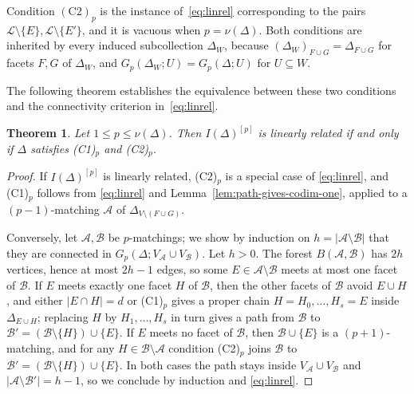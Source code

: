 \documentclass{amsart}
\newtheorem{Theorem}{Theorem}[section]
\theoremstyle{definition}
\theoremstyle{remark}
\begin{document}
Condition $(\mathrm C2)_p$ is the instance of~\eqref{eq:linrel}
corresponding to the pairs
$\mathcal L\setminus\{E\},\mathcal L\setminus\{E'\}$, and it is
vacuous when $p=\nu(\Delta)$.
Both conditions are inherited by every induced subcollection
$\Delta_W$, because $(\Delta_W)_{F\cup G}=\Delta_{F\cup G}$ for facets
$F,G$ of $\Delta_W$, and
$G_p(\Delta_W;U)=G_p(\Delta;U)$ for $U\subseteq W$.

The following theorem establishes the equivalence between these two
conditions and the connectivity criterion in~\eqref{eq:linrel}.


\begin{Theorem}\label{thm:lin-rel-char}
Let $1\leq p\leq\nu(\Delta)$. Then $I(\Delta)^{[p]}$ is linearly related if and only if $\Delta$ satisfies \textnormal{(C1)$_p$} and \textnormal{(C2)$_p$}.
\end{Theorem}
\begin{proof}
If $I(\Delta)^{[p]}$ is linearly related, (C2)$_p$ is a special case of \eqref{eq:linrel}, and (C1)$_p$ follows from \eqref{eq:linrel} and Lemma~\ref{lem:path-gives-codim-one}, applied to a $(p-1)$-matching $\mathcal A$ of $\Delta_{V\setminus(F\cup G)}$.

Conversely, let $\mathcal A,\mathcal B$ be $p$-matchings; we show by induction on $h=|\mathcal A\setminus\mathcal B|$ that they are connected in $G_p(\Delta;V_{\mathcal A}\cup V_{\mathcal B})$. Let $h>0$. The forest $B(\mathcal A,\mathcal B)$ has $2h$ vertices, hence at most $2h-1$ edges, so some $E\in\mathcal A\setminus\mathcal B$ meets at most one facet of $\mathcal B$. If $E$ meets exactly one facet $H$ of $\mathcal B$, then the other facets of $\mathcal B$ avoid $E\cup H$, and either $|E\cap H|=d$ or (C1)$_p$ gives a proper chain $H=H_0,\ldots,H_s=E$ inside $\Delta_{E\cup H}$; replacing $H$ by $H_1,\ldots,H_s$ in turn gives a path from $\mathcal B$ to $\mathcal B'=(\mathcal B\setminus\{H\})\cup\{E\}$. If $E$ meets no facet of $\mathcal B$, then $\mathcal B\cup\{E\}$ is a $(p+1)$-matching, and for any $H\in\mathcal B\setminus\mathcal A$ condition (C2)$_p$ joins $\mathcal B$ to $\mathcal B'=(\mathcal B\setminus\{H\})\cup\{E\}$. In both cases the path stays inside $V_{\mathcal A}\cup V_{\mathcal B}$ and $|\mathcal A\setminus\mathcal B'|=h-1$, so we conclude by induction and \eqref{eq:linrel}.
\end{proof}

\end{document}
